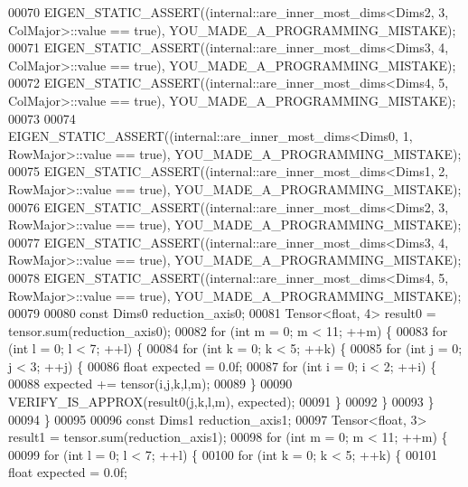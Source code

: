 \begin{DoxyCode}
00070   EIGEN\_STATIC\_ASSERT((internal::are\_inner\_most\_dims<Dims2, 3, ColMajor>::value == \textcolor{keyword}{true}), 
      YOU\_MADE\_A\_PROGRAMMING\_MISTAKE);
00071   EIGEN\_STATIC\_ASSERT((internal::are\_inner\_most\_dims<Dims3, 4, ColMajor>::value == \textcolor{keyword}{true}), 
      YOU\_MADE\_A\_PROGRAMMING\_MISTAKE);
00072   EIGEN\_STATIC\_ASSERT((internal::are\_inner\_most\_dims<Dims4, 5, ColMajor>::value == \textcolor{keyword}{true}), 
      YOU\_MADE\_A\_PROGRAMMING\_MISTAKE);
00073 
00074   EIGEN\_STATIC\_ASSERT((internal::are\_inner\_most\_dims<Dims0, 1, RowMajor>::value == \textcolor{keyword}{true}), 
      YOU\_MADE\_A\_PROGRAMMING\_MISTAKE);
00075   EIGEN\_STATIC\_ASSERT((internal::are\_inner\_most\_dims<Dims1, 2, RowMajor>::value == \textcolor{keyword}{true}), 
      YOU\_MADE\_A\_PROGRAMMING\_MISTAKE);
00076   EIGEN\_STATIC\_ASSERT((internal::are\_inner\_most\_dims<Dims2, 3, RowMajor>::value == \textcolor{keyword}{true}), 
      YOU\_MADE\_A\_PROGRAMMING\_MISTAKE);
00077   EIGEN\_STATIC\_ASSERT((internal::are\_inner\_most\_dims<Dims3, 4, RowMajor>::value == \textcolor{keyword}{true}), 
      YOU\_MADE\_A\_PROGRAMMING\_MISTAKE);
00078   EIGEN\_STATIC\_ASSERT((internal::are\_inner\_most\_dims<Dims4, 5, RowMajor>::value == \textcolor{keyword}{true}), 
      YOU\_MADE\_A\_PROGRAMMING\_MISTAKE);
00079 
00080   \textcolor{keyword}{const} Dims0 reduction\_axis0;
00081   Tensor<float, 4> result0 = tensor.sum(reduction\_axis0);
00082   \textcolor{keywordflow}{for} (\textcolor{keywordtype}{int} m = 0; m < 11; ++m) \{
00083     \textcolor{keywordflow}{for} (\textcolor{keywordtype}{int} l = 0; l < 7; ++l) \{
00084       \textcolor{keywordflow}{for} (\textcolor{keywordtype}{int} k = 0; k < 5; ++k) \{
00085         \textcolor{keywordflow}{for} (\textcolor{keywordtype}{int} j = 0; j < 3; ++j) \{
00086           \textcolor{keywordtype}{float} expected = 0.0f;
00087           \textcolor{keywordflow}{for} (\textcolor{keywordtype}{int} i = 0; i < 2; ++i) \{
00088             expected += tensor(i,j,k,l,m);
00089           \}
00090           VERIFY\_IS\_APPROX(result0(j,k,l,m), expected);
00091         \}
00092       \}
00093     \}
00094   \}
00095 
00096   \textcolor{keyword}{const} Dims1 reduction\_axis1;
00097   Tensor<float, 3> result1 = tensor.sum(reduction\_axis1);
00098   \textcolor{keywordflow}{for} (\textcolor{keywordtype}{int} m = 0; m < 11; ++m) \{
00099     \textcolor{keywordflow}{for} (\textcolor{keywordtype}{int} l = 0; l < 7; ++l) \{
00100       \textcolor{keywordflow}{for} (\textcolor{keywordtype}{int} k = 0; k < 5; ++k) \{
00101         \textcolor{keywordtype}{float} expected = 0.0f;

\end{DoxyCode}
